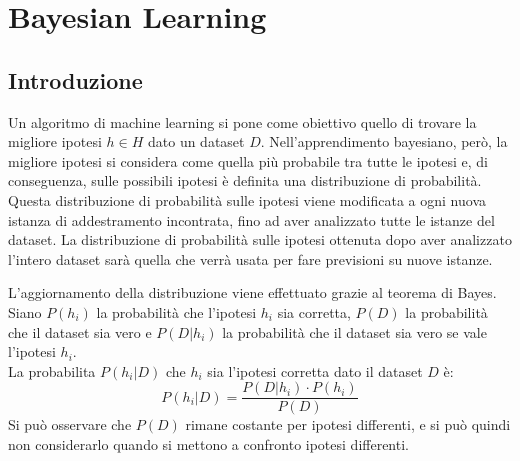\section{Bayesian Learning}
\subsection{Introduzione}
Un algoritmo di machine learning si pone come obiettivo quello di trovare la migliore ipotesi $h \in H$ dato un dataset $D$.
Nell'apprendimento bayesiano, però, la migliore ipotesi si considera come quella più probabile tra tutte le ipotesi e, di conseguenza, sulle possibili ipotesi è definita una distribuzione di probabilità.
Questa distribuzione di probabilità sulle ipotesi viene modificata a ogni nuova istanza di addestramento incontrata, fino ad aver analizzato tutte le istanze del dataset. La distribuzione di probabilità sulle ipotesi ottenuta dopo aver analizzato l'intero dataset sarà quella che verrà usata per fare previsioni su nuove istanze.

L'aggiornamento della distribuzione viene effettuato grazie al teorema di Bayes.\\
Siano $P(h_i)$ la probabilità che l'ipotesi $h_i$ sia corretta, $P(D)$ la probabilità che il dataset sia vero e $P(D | h_i)$ la probabilità che il dataset sia vero se vale l'ipotesi $h_i$.\\
La probabilita $P(h_i | D)$ che $h_i$ sia l'ipotesi corretta dato il dataset $D$ è:
\[
    P(h_i | D) = \frac{P(D | h_i) \cdot P(h_i)}{P(D)}
\]
Si può osservare che $P(D)$ rimane costante per ipotesi differenti, e si può quindi non considerarlo quando si mettono a confronto ipotesi differenti.

